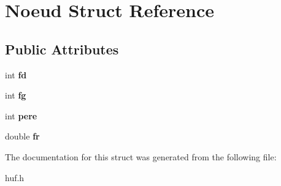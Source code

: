 \hypertarget{structNoeud}{}\section{Noeud Struct Reference}
\label{structNoeud}
\subsection*{Public Attributes}
\begin{DoxyCompactItemize}
\item 
\mbox{\label{structNoeud_a67400f9553fd71df5a67cf32dc2ab639}} 
int {\bfseries fd}
\item 
\mbox{\label{structNoeud_a2aeffae918ba8274b8b5f75706bb84de}} 
int {\bfseries fg}
\item 
\mbox{\label{structNoeud_a2ea9146a5bd3678a27f8a56c9306de22}} 
int {\bfseries pere}
\item 
\mbox{\label{structNoeud_a071a0f516c9cd3bba249663d3dbd9a93}} 
double {\bfseries fr}
\end{DoxyCompactItemize}


The documentation for this struct was generated from the following file\+:\begin{DoxyCompactItemize}
\item 
huf.\+h\end{DoxyCompactItemize}
